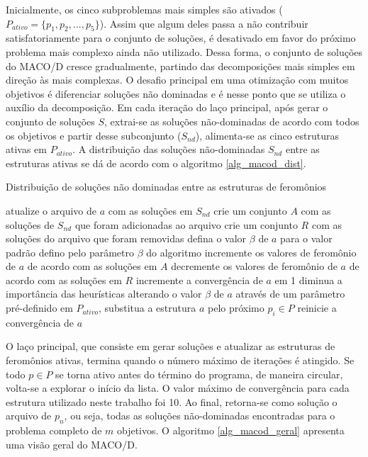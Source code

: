 Inicialmente, os cinco subproblemas mais simples são ativados ($P_{ativo} = \{p_1, p_2, ..., p_5\}$). Assim que algum deles passa a não contribuir satisfatoriamente para o conjunto de soluções, é desativado em favor do próximo problema mais complexo ainda não utilizado. Dessa forma, o conjunto de soluções do MACO/D cresce gradualmente, partindo das decomposições mais simples em direção às mais complexas. O desafio principal em uma otimização com muitos objetivos é diferenciar soluções não dominadas e é nesse ponto que se utiliza o auxílio da decomposição. Em cada iteração do laço principal, após gerar o conjunto de soluções $S$, extrai-se as soluções não-dominadas de acordo com todos os objetivos e partir desse subconjunto ($S_{nd}$), alimenta-se as cinco estruturas ativas em $P_{ativo}$. A distribuição das soluções não-dominadas $S_{nd}$ entre as estruturas ativas se dá de acordo com o algoritmo \ref{alg_macod_dist}.

\begin{algorithm}
	\caption{Distribuição de soluções não dominadas entre as estruturas de feromônios}
	\label{alg_macod_dist}
	\begin{algorithmic}[1]
			\State atualize o arquivo de $a$ com as soluções em $S_{nd}$
			\State crie um conjunto $A$ com as soluções de $S_{nd}$ que foram adicionadas ao arquivo
			\State crie um conjunto $R$ com as soluções do arquivo que foram removidas
				\State defina o valor $\beta$ de $a$ para o valor padrão defino pelo parâmetro $\beta$ do algoritmo
				\State incremente os valores de feromônio de $a$ de acordo com as soluções em $A$
				\State decremente os valores de feromônio de $a$ de acordo com as soluções em $R$
			\Else
				\State incremente a convergência de $a$ em 1
				\State diminua a importância das heurísticas alterando o valor $\beta$ de $a$ através de um parâmetro pré-definido
					\State em $P_{ativo}$, substitua a estrutura $a$ pelo próximo $p_i \in P$
					\State reinicie a convergência de $a$
				\EndIf
			\EndIf
		\EndFor
	\end{algorithmic}
\end{algorithm}

O laço principal, que consiste em gerar soluções e atualizar as estruturas de feromônios ativas, termina quando o número máximo de iterações é atingido. Se todo $p \in P$ se torna ativo antes do término do programa, de maneira circular, volta-se a explorar o início da lista.  O valor máximo de convergência para cada estrutura utilizado neste trabalho foi 10. Ao final, retorna-se como solução o arquivo de $p_n$, ou seja, todas as soluções não-dominadas encontradas para o problema completo de $m$ objetivos. O algoritmo \ref{alg_macod_geral} apresenta uma visão geral do MACO/D.

